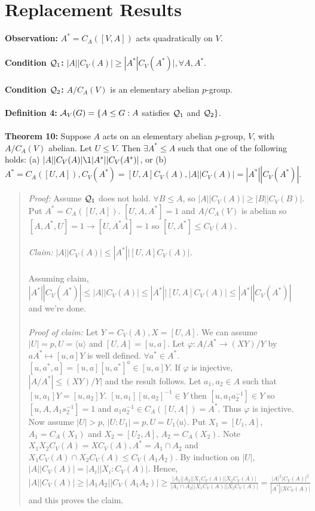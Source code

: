 \section {Replacement Results}
{\bf Observation:} $A^* = C_A([V,A])$ acts quadratically on $V$.
\\
\\
{\bf Condition ${\cal Q}_1$:}
$|A| |C_V(A)| \ge |A^*| C_V(A^*)|, \forall A, A^*$.
\\
\\
{\bf Condition ${\cal Q}_2$:}
$A/C_A(V)$ is an elementary abelian $p$-group.
\\
\\
{\bf Definition 4:}  ${\cal A}_V(G) = \{ A \le G: A$ satisfies ${\cal Q}_1$ and ${\cal Q}_2 \}$.
\\
\\
{\bf Theorem 10:}  
Suppose $A$ acts on an elementary abelian $p$-group, $V$, with $A/C_A(V)$ abelian.
Let $U \le V$.  Then $\exists A^* \le A$ such that one of the following holds:
(a) $|A| |C_V(A)| \l |A^*| |C_V(A^*)|$, or 
(b)  $A^* = C_A([U,A]), C_V(A^*)= [U,A] C_V(A), |A| |C_V(A)| = |A^*| |C_V(A^*)|$.
\begin{quote}
\emph{Proof:}  
Assume ${\cal Q}_1$ does not hold.   $\forall B \le A$, so $|A| |C_V(A)| \ge |B| |C_V(B)|$.
Put $A^* = C_A([U,A])$.  $[U, A, A^*]=1$ and $A/C_A(V)$ is abelian so
$[A, A^*, U] =1  \rightarrow [U,A^* A] = 1$ so $[U, A^*] \le C_V(A)$.
\\
\\
\emph{Claim:} $|A| |C_V(A)| \le |A^*| |[U,A] C_V(A)|$.
\\
\\
Assuming claim, $|A^*| |C_V(A^*)| \le |A| |C_V(A)| \le |A^*| |[U,A] C_V(A)| \le |A^*| |C_V(A^*)|$
and we're done.
\\
\\
\emph{Proof of claim:}
Let $Y= C_V(A), X= [U,A]$.
We can assume $|U|= p, U= \langle u \rangle $ and $[U, A]= [u,a]$.
Let $\varphi: A/A^* \rightarrow (XY)/Y$ by $a A^* \mapsto [u,a]Y$ is well defined.
$\forall a^* \in A^*$.
$[u, a^*, a]= [u,a] [u, a^*]^a \in [u,a]Y$.
If $\varphi$ is injective, $|A/A^*| \le (XY)/Y|$ and the result follows.
Let $a_1, a_2 \in A$ such that $[u, a_1]Y= [u, a_2 ]Y$.
$[u, a_1] [u, a_2 ]^{-1} \in Y$ then $[u, a_1 a_2^{-1}] \in Y$ so
$[u, A, A_1 s_2^{-1}]= 1 $
and $a_1 a_2^{-1} \in C_A([U,A])=A^*$.  Thus $\varphi$ is injective.
Now assume $|U| > p$, $|U:U_1|= p, U= U_1 \langle u \rangle $.
Put $X_1= [U_1, A]$, $A_1 = C_A(X_1)$ and
$X_2= [U_2, A]$, $A_2 = C_A(X_2)$.
Note $X_1 X_2 C_V(A)= X C_V(A), A^* = A_1 \cap A_2$ and
$X_1 C_V(A) \cap X_2 C_V(A) \le C_V(A_1 A_2 )$.
By induction on $|U|$,
$|A| |C_V(A)| = |A_i | |X_i:C_V(A)|$.  Hence,
$|A| |C_V(A)| \ge
|A_1 A_2| |C_V(A_1 A_2 ) | \ge
{\frac {|A_1| |A_2| |X_1 C_V(A)| |X_2 C_V(A)|}
{|A_1 \cap A_2| |X_1 C_V(A)| |X_2 C_V(A)|} }
= {\frac {|A|^2 |C_V(A)|^2} {|A^*| |X C_V(A)|}}$ and this proves the claim.
\end{quote}
